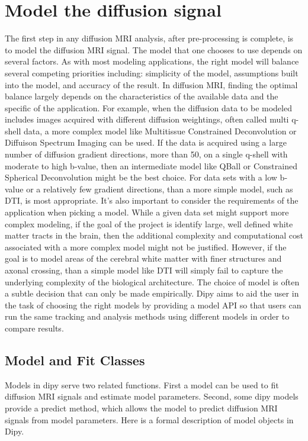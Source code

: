\section{Model the diffusion signal}
The first step in any diffusion MRI analysis, after pre-processing is complete, is to model the diffusion MRI signal. The model that one chooses to use depends on several factors. As with most modeling applications, the right model will balance several competing priorities including: simplicity of the model, assumptions built into the model, and accuracy of the result. In diffusion MRI, finding the optimal balance largely depends on the characteristics of the available data and the specific of the application. For example, when the diffusion data to be modeled includes images acquired with different diffusion weightings, often called multi q-shell data, a more complex model like Multitissue Constrained Deconvolution or Diffuison Spectrum Imaging can be used. If the data is acquired using a large number of diffusion gradient directions, more than 50, on a single q-shell with moderate to high b-value, then an intermediate model like QBall or Constrained Spherical Deconvolution might be the best choice. For data sets with a low b-value or a relatively few gradient directions, than a more simple model, such as DTI, is most appropriate. It's also important to consider the requirements of the application when picking a model. While a given data set might support more complex modeling, if the goal of the project is identify large, well defined white matter tracts in the brain, then the additional complexity and computational cost associated with a more complex model might not be justified. However, if the goal is to model areas of the cerebral white matter with finer structures and axonal crossing, than a simple model like DTI will simply fail to capture the underlying complexity of the biological architecture. The choice of model is often a subtle decision that can only be made empirically. Dipy aims to aid the user in the task of choosing the right models by providing a model API so that users can run the same tracking and analysis methods using different models in order to compare results.

\subsection{Model and Fit Classes}
Models in dipy serve two related functions. First a model can be used to fit diffusion MRI signals and estimate model parameters. Second, some dipy models provide a predict method, which allows the model to predict diffusion MRI signals from model parameters. Here is a formal description of model objects in Dipy.


